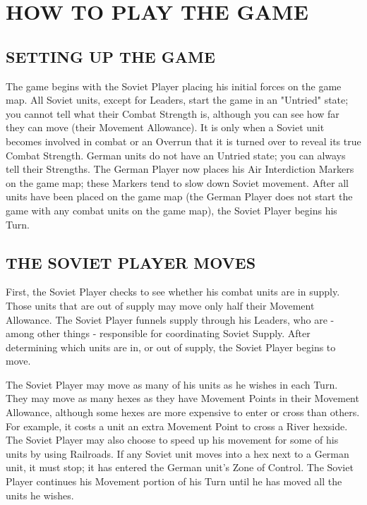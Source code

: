 \section{HOW TO PLAY THE GAME}

\subsection{SETTING UP THE GAME}

The game begins with the Soviet Player placing his initial forces on the game map. All Soviet units, except for Leaders, start the game in an "Untried" state; you cannot tell what their Combat Strength is, although you can see how far they can move (their Movement Allowance). It is only when a Soviet unit becomes involved in combat or an Overrun that it is turned over to reveal its true Combat Strength. German units do not have an Untried state; you can always tell their Strengths. The German Player now places his Air Interdiction Markers on the game map; these Markers tend to slow down Soviet movement. After all units have been placed on the game map (the German Player does not start the game with any combat units on the game map), the Soviet Player begins his Turn.

\subsection{THE SOVIET PLAYER MOVES}

First, the Soviet Player checks to see whether his combat units are in supply. Those units that are out of supply may move only half their Movement Allowance. The Soviet Player funnels supply through his Leaders, who are - among other things - responsible for coordinating Soviet Supply. After determining which units are in, or out of supply, the Soviet Player begins to move.

The Soviet Player may move as many of his units as he wishes in each Turn. They may move as many hexes as they have Movement Points in their Movement Allowance, although some hexes are more expensive to enter or cross than others. For example, it costs a unit an extra Movement Point to cross a River hexside. The Soviet Player may also choose to speed up his movement for some of his units by using Railroads. If any Soviet unit moves into a hex next to a German unit, it must stop; it has entered the German unit's Zone of Control. The Soviet Player continues his Movement portion of his Turn until he has moved all the units he wishes.

